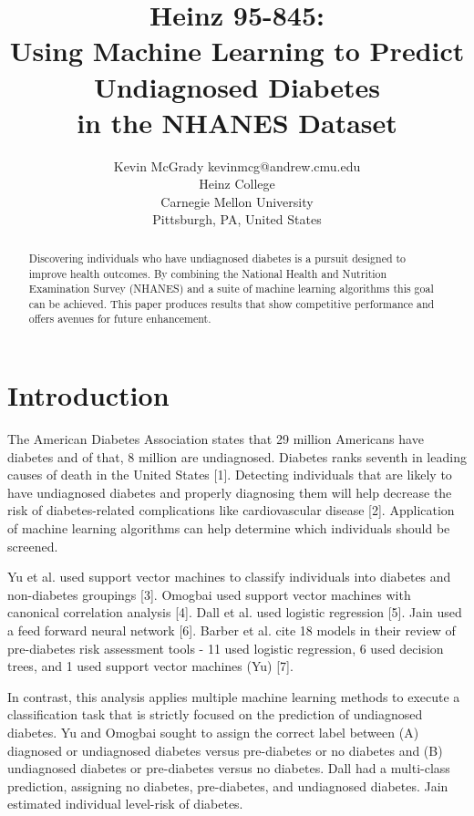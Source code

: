 \documentclass[twoside,11pt]{article}
\begin{document}
\title{Heinz 95-845: \\Using Machine Learning to Predict Undiagnosed Diabetes \\in the NHANES Dataset}

\author{\name Kevin McGrady \email kevinmcg@andrew.cmu.edu \\
       \addr Heinz College\\
       Carnegie Mellon University\\
       Pittsburgh, PA, United States} 

\maketitle

\begin{abstract}
Discovering individuals who have undiagnosed diabetes is a pursuit designed to improve health outcomes. By combining the National Health and Nutrition Examination Survey (NHANES) and a suite of machine learning algorithms this goal can be achieved. This paper produces results that show competitive performance and offers avenues for future enhancement.
\end{abstract}

\section{Introduction}
The American Diabetes Association states that 29 million Americans have diabetes and of that, 8 million are undiagnosed. Diabetes ranks seventh in leading causes of death in the United States [1]. Detecting individuals that are likely to have undiagnosed diabetes and properly diagnosing them will help decrease the risk of diabetes-related complications like cardiovascular disease [2]. Application of machine learning algorithms can help determine which individuals should be screened. 

Yu et al. used support vector machines to classify individuals into diabetes and non-diabetes groupings [3]. Omogbai used support vector machines with canonical correlation analysis [4]. Dall et al. used logistic regression [5]. Jain used a feed forward neural network [6]. Barber et al. cite 18 models in their review of pre-diabetes risk assessment tools - 11 used logistic regression, 6 used decision trees, and 1 used support vector machines (Yu) [7].

In contrast, this analysis applies multiple machine learning methods to execute a classification task that is strictly focused on the prediction of undiagnosed diabetes. Yu and Omogbai sought to assign the correct label between (A) diagnosed or undiagnosed diabetes versus pre-diabetes or no diabetes and (B) undiagnosed diabetes or pre-diabetes versus no diabetes. Dall had a multi-class prediction, assigning no diabetes, pre-diabetes, and undiagnosed diabetes. Jain estimated individual level-risk of diabetes.
\end{document}
